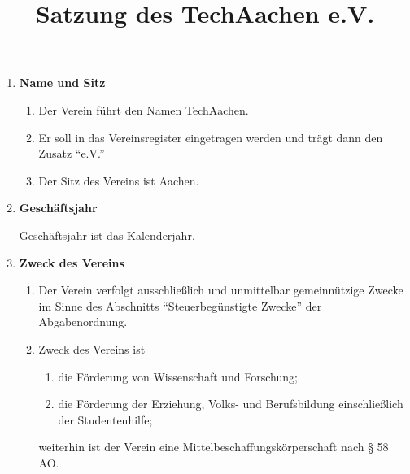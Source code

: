 \documentclass[german]{article}
\title{\textsf{\textbf{Satzung des TechAachen e.V.}}}
\author{}
\date{}
\newcommand{\paragr}[1]{\item \textsf{\textbf{#1}}}
\begin{document}
	\maketitle
	
	\begin{enumerate}
		\paragr{Name und Sitz}
		
		\begin{enumerate}
			
			\item Der Verein führt den Namen TechAachen.
			
			\item Er soll in das Vereinsregister eingetragen werden und trägt dann den Zusatz ``e.V.''
			
			\item Der Sitz des Vereins ist Aachen.
			
		\end{enumerate}
		
		\paragr{Geschäftsjahr}
		
		Geschäftsjahr ist das Kalenderjahr.
		
		
		\paragr{Zweck des Vereins}
		\begin{enumerate}
			
			\item Der Verein verfolgt ausschließlich und unmittelbar gemeinnützige Zwecke im Sinne des Abschnitts ``Steuerbegünstigte Zwecke'' der Abgabenordnung.
			
			\item Zweck des Vereins ist \label{zweck}
			\begin{enumerate}
				\item \label{zweck_wissenschaft_forschung} die Förderung von Wissenschaft und Forschung;
				\item \label{zweck_bildung} die Förderung der Erziehung, Volks- und Berufsbildung einschließlich der Studentenhilfe;
			\end{enumerate}
			weiterhin ist der Verein eine Mittelbeschaffungskörperschaft nach § 58 AO.
			

\end{enumerate}
\end{enumerate}
\end{document}
